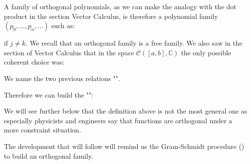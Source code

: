 	A family of orthogonal polynomials, as we can make the analogy with the dot product in the section Vector Calculus, is therefore a polynomial family $(p_0,...,p_n,...)$ such as:
	
	if $j \ne k$. We recall that an orthogonal family is a free family. We also saw in the section of Vector Calculus that in the space $\mathcal{C}([a,b],\mathbb{C})$ the only possible coherent choice was:
	
	
	We name the two previous relations "".
	
	Therefore we can build the "":
	
	\begin{tcolorbox}[title=Remark,colframe=black,arc=10pt]
	We will see further below that the definition above is not the most general one as especially physicists and engineers say that functions are orthogonal under a more constraint situation.
	\end{tcolorbox}
	The development that will follow will remind us the Gram-Schmidt procedure () to build an orthogonal family.
	
